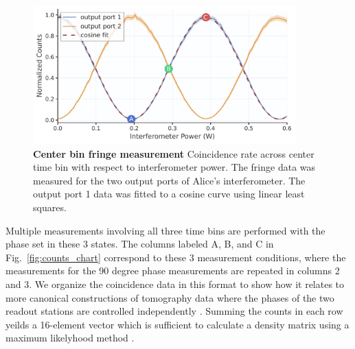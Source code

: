 \documentclass[11pt]{caltech_thesis} %
\begin{document}
\hypertarget{fig:fringes}{%
\begin{figure}
\centering
\includegraphics[width=0.9\textwidth,height=\textheight]{./chapter_05/figs/fringes_light.pdf}
\caption[{Center bin fringe measurement}]{\textbf{Center bin fringe measurement} Coincidence rate across center time bin with respect to interferometer power. The fringe data was measured for the two output ports of Alice's interferometer. The output port 1 data was fitted to a cosine curve using linear least squares.}
\label{fig:fringes}
\end{figure}
}

Multiple measurements involving all three time bins are performed with the phase set in these 3 states. The columns labeled A, B, and C in Fig.~\ref{fig:counts_chart} correspond to these 3 measurement conditions, where the measurements for the 90 degree phase measurements are repeated in columns 2 and 3. We organize the coincidence data in this format to show how it relates to more canonical constructions of tomography data where the phases of the two readout stations are controlled independently \autocite{Zhang2021Tomography,Takesue09Tomography}. Summing the counts in each row yeilds a 16-element vector which is sufficient to calculate a density matrix using a maximum likelyhood method \autocite{tomography2023}.
\end{document}
